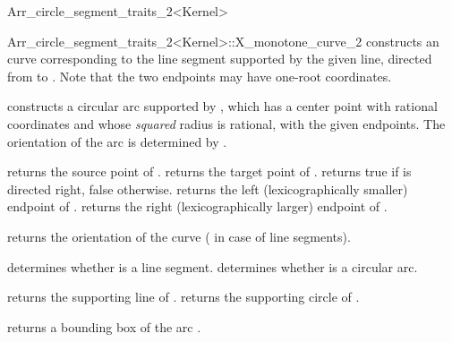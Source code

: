 \begin{ccRefClass}{Arr_circle_segment_traits_2<Kernel>}
\begin{ccClass}{Arr_circle_segment_traits_2<Kernel>::X_monotone_curve_2}
    {constructs an curve corresponding to the line segment supported by
     the given line, directed from  to .
     Note that the two endpoints may have one-root coordinates.
     }

    {constructs a circular arc supported by , which has a
     center point with rational coordinates and whose {\em squared}
     radius is rational, with the given endpoints. The orientation of the
     arc is determined by .
     }

\ccAccessFunctions

  {returns the source point of \ccVar{}.}
\ccGlue
{}
  {returns the target point of \ccVar{}.}
  {returns true if \ccVar{} is directed right, false otherwise.}
\ccGlue
{}
  {returns the left (lexicographically smaller) endpoint of \ccVar{}.}
\ccGlue
{}
  {returns the right (lexicographically larger) endpoint of \ccVar{}.}

  {returns the orientation of the curve ( in case of
   line segments).}

  {determines whether \ccVar{} is a line segment.}
\ccGlue
{}
  {determines whether \ccVar{} is a circular arc.}

  {returns the supporting line of \ccVar{}.
   }
\ccGlue
{}
  {returns the supporting circle of \ccVar{}.
   }

  {returns a bounding box of the arc \ccVar{}.}

\end{ccClass}

\end{ccRefClass}

\ccRefPageEnd
